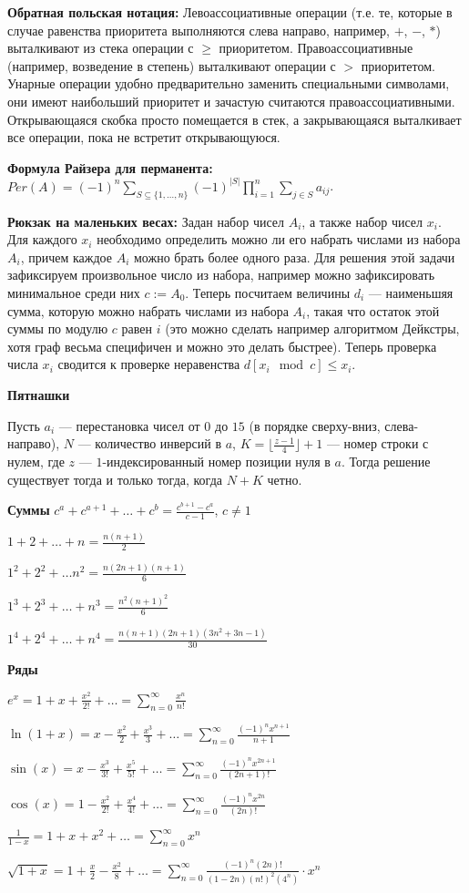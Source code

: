 \textbf{Обратная польская нотация:}
Левоассоциативные операции (т.е. те, которые в случае равенства приоритета выполняются слева направо, например, $+$, $-$, $*$)
выталкивают из стека операции с $\geq$ приоритетом. Правоассоциативные (например, возведение в степень) выталкивают операции
с $>$ приоритетом. Унарные операции удобно предварительно заменить специальными символами, они имеют наибольший приоритет и
зачастую считаются правоассоциативными. Открывающаяся скобка просто помещается в стек, а закрывающаяся выталкивает все
операции, пока не встретит открывающуюся.

\textbf{Формула Райзера для перманента:}
$Per(A)=(-1)^n\sum\limits_{S\subseteq \{1, \ldots , n\}}(-1)^{|S|}\prod\limits_{i=1}^n\sum\limits_{j\in S}a_{ij}$.

\textbf{Рюкзак на маленьких весах:}
Задан набор чисел $A_i$, а также набор чисел $x_i$. Для каждого $x_i$ необходимо определить можно ли его набрать числами из набора $A_i$, причем каждое $A_i$ можно брать
более одного раза. Для решения этой задачи зафиксируем произвольное число из набора, например можно зафиксировать минимальное среди них  $c := A_0$. Теперь посчитаем величины
$d_i$ --- наименьшяя сумма, которую можно набрать числами из набора $A_i$, такая что остаток этой суммы по модулю $c$ равен $i$ (это можно сделать например алгоритмом
Дейкстры, хотя граф весьма специфичен и можно это делать быстрее). Теперь проверка числа $x_i$ сводится к проверке неравенства $d[x_i \mod c] \le x_i$.

\textbf{Пятнашки}

Пусть $a_i$ --- перестановка чисел от $0$ до $15$ (в порядке сверху-вниз, слева-направо),
$N$ --- количество инверсий в $a$, $K = \lfloor\frac{z - 1}4\rfloor + 1$ --- номер строки с нулем,
где $z$ --- $1$-индексированный номер позиции нуля в $a$. Тогда решение существует тогда и только
тогда, когда $N + K$ четно.

\textbf{Суммы}
$
c^a + c^{a + 1} + \ldots + c^{b} = \frac{c^{b + 1} - c^{a}}{c - 1}
$, $c \neq 1$

$1 + 2 + \ldots + n = \frac{n(n + 1)}{2}$

$1^2 + 2^2 + \ldots n^2 = \frac{n(2n + 1)(n + 1)}{6}$

$1^3 + 2^3 + \ldots + n^3 = \frac{n^2(n + 1)^2}{6}$

$1^4 + 2^4 + \ldots + n^4 = \frac{n(n + 1)(2n + 1)(3n^2 + 3n - 1)}{30}$

\textbf{Ряды}

$e^x = 1 + x + \frac{x^2}{2!} + \ldots 
= \sum_{n=0}^{\infty}\frac{x^n}{n!}$

$\ln(1 + x) = x - \frac{x^2}{2} + \frac{x^3}{3} + \ldots 
= \sum_{n = 0}^{\infty}\frac{(-1)^n x^{n + 1}}{n + 1}$

$\sin(x) = x - \frac{x^3}{3!} + \frac{x^5}{5!} + \ldots
= \sum_{n = 0}^{\infty}\frac{(-1)^n x^{2n + 1}}{(2n + 1)!}$

$\cos(x) = 1 - \frac{x^2}{2!} + \frac{x^4}{4!} + \ldots
= \sum_{n = 0}^{\infty}\frac{(-1)^n x^{2n}}{(2n)!}$

$\frac{1}{1 - x} = 1 + x + x^2 + \ldots 
= \sum_{n = 0}^{\infty}x^n$

$\sqrt{1 + x} = 1 + \frac{x}{2} - \frac{x^2}{8} + \ldots
= \sum_{n = 0}^{\infty}\frac{(-1)^n (2n)!}{(1 - 2n)(n!)^2(4^n)} \cdot x^n$

